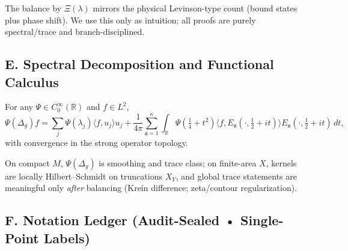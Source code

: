 \begin{remark}
The balance by $\Xi(\lambda)$ mirrors the physical Levinson-type count (bound states plus phase shift). We use this only as intuition; all proofs are purely spectral/trace and branch-disciplined.
\end{remark}


\subsection*{E. Spectral Decomposition and Functional Calculus}
\label{subsec:spectral-decomposition-part1}

\begin{theorem}
\label{thm:functional-calculus-part1}
For any $\Psi\in C_0^\infty(\mathbb R)$ and $f\in L^2$,
\[
  \Psi(\Delta_g)f
  = \sum_{j} \Psi(\lambda_j)\langle f,u_j\rangle u_j
  + \frac{1}{4\pi}\sum_{\mathfrak a=1}^{\kappa}\int_{\mathbb R}
      \Psi\!\left(\tfrac14+t^2\right)
      \langle f,E_{\mathfrak a}(\cdot,\tfrac12+it)\rangle
      E_{\mathfrak a}(\cdot,\tfrac12+it)\,dt,
\]
with convergence in the strong operator topology.
\end{theorem}

\begin{remark}
\label{rem:trace-classes-part1}
On compact $M$, $\Psi(\Delta_g)$ is smoothing and trace class; on finite-area $X$, kernels are locally Hilbert--Schmidt on truncations $X_Y$, and global trace statements are meaningful only \emph{after} balancing (Krein difference; zeta/contour regularization).
\end{remark}


\subsection*{F. Notation Ledger (Audit-Sealed • Single-Point Labels)}
\label{subsec:notation-ledger-part1}


